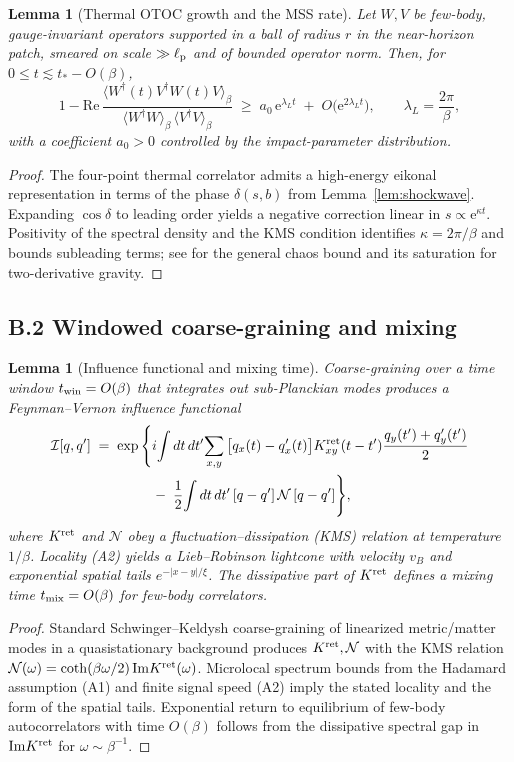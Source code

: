 \documentclass[11pt,a4paper]{article}
\theoremstyle{plain}
\newtheorem{lemma}[theorem]{Lemma}
\theoremstyle{definition}
\theoremstyle{remark}
\begin{document}
\begin{lemma}[Thermal OTOC growth and the MSS rate]
\label{lem:otoc-growth}
Let $W,V$ be few-body, gauge-invariant operators supported in a ball of radius $r$ in the near-horizon patch, smeared on scale $\gg \ell_{\rm p}$ and of bounded operator norm.
Then, for $0\le t \lesssim t_\ast-O(\beta)$,
\[
1-\mathrm{Re}\,\frac{\langle W^\dagger(t)V^\dagger W(t)V\rangle_\beta}{\langle W^\dagger W\rangle_\beta\,\langle V^\dagger V\rangle_\beta}
\;\ge\; a_0\,\mathrm{e}^{\lambda_L t}\;+\;O\!\big(\mathrm{e}^{2\lambda_L t}\big),
\qquad \lambda_L=\frac{2\pi}{\beta},
\]
with a coefficient $a_0>0$ controlled by the impact-parameter distribution.
\end{lemma}
\begin{proof}
The four-point thermal correlator admits a high-energy eikonal representation in terms of the phase $\delta(s,b)$ from Lemma~\ref{lem:shockwave}.
Expanding $\cos\delta$ to leading order yields a negative correction linear in $s\propto \mathrm{e}^{\kappa t}$.
Positivity of the spectral density and the KMS condition identifies $\kappa=2\pi/\beta$ and bounds subleading terms; see \cite{Maldacena:2016} for the general chaos bound and its saturation for two-derivative gravity.
\end{proof}

\subsection*{B.2 Windowed coarse-graining and mixing}
\begin{lemma}[Influence functional and mixing time]
\label{lem:IF}
Coarse-graining over a time window $t_{\rm win}=O(\beta)$ that integrates out sub-Planckian modes produces a Feynman--Vernon influence functional
\begin{align*}
\mathcal{I}[q,q'] \;=\; \exp\Bigg\{& i\!\int dt\,dt'\!\sum_{x,y}\big[q_x(t)-q'_x(t)\big]K^{\rm ret}_{xy}(t-t')\frac{q_y(t')+q'_y(t')}{2} \\
&-\;\frac{1}{2}\!\int dt\,dt'\,[q-q']\,\mathcal{N}\,[q-q']\Bigg\},
\end{align*}
where $K^{\rm ret}$ and $\mathcal{N}$ obey a fluctuation--dissipation (KMS) relation at temperature $1/\beta$.
Locality (A2) yields a Lieb--Robinson lightcone with velocity $v_B$ and exponential spatial tails $e^{-|x-y|/\xi}$.
The dissipative part of $K^{\rm ret}$ defines a mixing time $t_{\rm mix}=O(\beta)$ for few-body correlators.
\end{lemma}
\begin{proof}
Standard Schwinger--Keldysh coarse-graining of linearized metric/matter modes in a quasistationary background produces $K^{\rm ret},\mathcal{N}$ with the KMS relation $\mathcal{N}(\omega)=\coth(\beta\omega/2)\,\mathrm{Im}K^{\rm ret}(\omega)$.
Microlocal spectrum bounds from the Hadamard assumption (A1) and finite signal speed (A2) imply the stated locality and the form of the spatial tails.
Exponential return to equilibrium of few-body autocorrelators with time $O(\beta)$ follows from the dissipative spectral gap in $\mathrm{Im}K^{\rm ret}$ for $\omega\sim \beta^{-1}$.
\end{proof}
\end{document}
